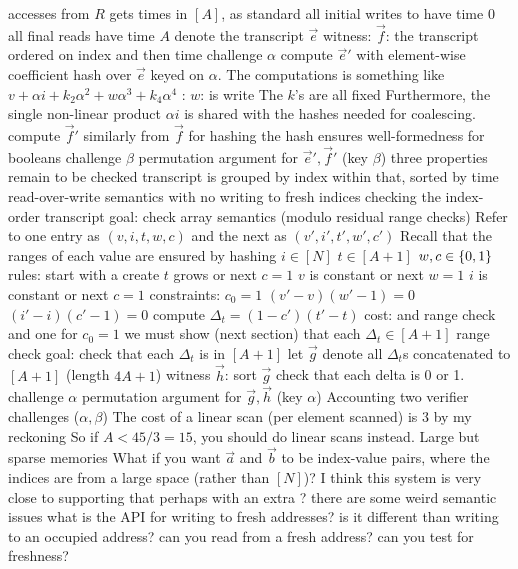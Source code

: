 \begin{outline}
      \4 accesses from $R$ gets times in $[A]$, as standard
      \4 all initial writes to have time 0
      \4 all final reads have time $A$
  \2 denote the transcript $\vec e$
  \2 witness: $\vec f$: the transcript ordered on index and then time
  \2 challenge $\alpha$
  \2 compute $\vec e'$ with element-wise coefficient hash over $\vec e$ keyed on $\alpha$.
    \3 The computations is something like $v + \alpha i + k_2 \alpha^2 + w \alpha^3 + k_4 \alpha^4$
      \4: $w$: is write
    \3 The $k$'s are all fixed
    \3 
    \3 Furthermore, the single non-linear product $\alpha i$ is shared with the
    hashes needed for coalescing.
  \2 compute $\vec f'$ similarly from $\vec f$
    \3  for hashing
    \3 the hash ensures well-formedness for booleans
  \2 challenge $\beta$
  \2 permutation argument for $\vec e', \vec f'$ (key $\beta$)
    \3 
  \2 three properties remain to be checked
    \3 transcript is grouped by index
    \3 within that, sorted by time
    \3 read-over-write semantics
      \4 with no writing to fresh indices
\1 checking the index-order transcript
  \2 goal: check array semantics (modulo residual range checks)
  \2 Refer to one entry as $(v, i, t, w, c)$ and the next as $(v', i', t', w', c')$
  \2 Recall that the ranges of each value are ensured by hashing
    \3 $i \in [N]$
    \3 $t \in [A+1]$
    \3 $w, c \in \{0,1\}$
  \2 rules:
    \3 start with a create
    \3 $t$ grows or next $c=1$
    \3 $v$ is constant or next $w=1$
    \3 $i$ is constant or next $c=1$
  \2 constraints:
    \3 $c_0 = 1$
    \3 $(v'-v)(w'-1)=0$
    \3 $(i'-i)(c'-1)=0$
    \3 compute $\Delta_t = (1-c')(t'-t)$
    \3 cost: 
      \4 and range check
      \4 and one for $c_0 = 1$
    \3 we must show (next section) that each $\Delta_t \in [A+1]$
\1 range check
  \2 goal: check that each $\Delta_t$ is in $[A+1]$
  \2 let $\vec g$ denote all $\Delta_t$s concatenated to $[A+1]$ (length $4A+1$)
  \2 witness $\vec h$: sort $\vec g$
    \3 check that each delta is 0 or 1. 
  \2 challenge $\alpha$
  \2 permutation argument for $\vec g, \vec h$ (key $\alpha$)
    \3 
\1 Accounting
  \2 two verifier challenges ($\alpha,\beta$)
  \2 
  \2 
    \3 The cost of a linear scan (per element scanned) is $3$ by my reckoning
    \3 So if $A < 45/3 = 15$, you should do linear scans instead.
\1 Large but sparse memories
  \2 What if you want $\vec a$ and $\vec b$ to be index-value pairs, where the
  indices are from a large space (rather than $[N]$)?
  \2 I think this system is very close to supporting that
    \3 perhaps with an extra ?
    \3 there are some weird semantic issues
      \4 what is the API for writing to fresh addresses?
      \4 is it different than writing to an occupied address?
      \4 can you read from a fresh address?
      \4 can you test for freshness?
\end{outline}
